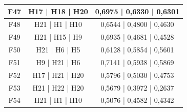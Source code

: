 \documentclass{prgrado}
\begin{document}
\begin{longtable}{|c|c|c|}
F47 & H17 | H18 | H20 & 0,6975 | 0,6330 | 0,6301 \\ \hline
F48 & H21 | H1 | H10 & 0,6544 | 0,4800 | 0,4630 \\ \hline
F49 & H21 | H15 | H9 & 0,6935 | 0,4681 | 0,4528 \\ \hline
F50 & H21 | H6 | H5 & 0,6128 | 0,5854 | 0,5601 \\ \hline
F51 & H9 | H21 | H6 & 0,7141 | 0,5938 | 0,5869 \\ \hline
F52 & H17 | H21 | H20 & 0,5796 | 0,5030 | 0,4753 \\ \hline
F53 & H21 | H22 | H20 & 0,5679 | 0,3972 | 0,2637 \\ \hline
F54 & H21 | H1 | H10 & 0,5076 | 0,4582 | 0,4342 \\ \hline
\end{longtable}
\end{document}

